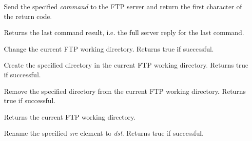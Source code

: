 \label{wxftpsendcommand}


Send the specified {\it command} to the FTP server and return the first
character of the return code.


\label{wxftpgetlastresult}


Returns the last command result, i.e. the full server reply for the last
command.



\label{wxftpchdir}


Change the current FTP working directory.
Returns true if successful.


\label{wxftpmkdir}


Create the specified directory in the current FTP working directory.
Returns true if successful.


\label{wxftprmdir}


Remove the specified directory from the current FTP working directory.
Returns true if successful.


\label{wxftppwd}


Returns the current FTP working directory.



\label{wxftprename}


Rename the specified {\it src} element to {\it dst}. Returns true if successful.



\label{wxftprmfile}

